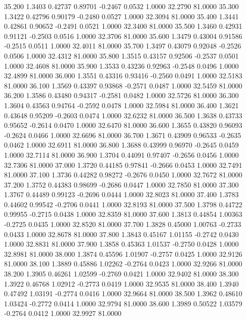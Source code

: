   35.200   1.3403   0.42737   0.89701  -0.2467   0.0532   1.0000  32.2790  81.0000
  35.300   1.3422   0.42796   0.90179  -0.2480   0.0527   1.0000  32.3094  81.0000
  35.400   1.3441   0.42861   0.90652  -0.2491   0.0521   1.0000  32.3400  81.0000
  35.500   1.3460   0.42931   0.91121  -0.2503   0.0516   1.0000  32.3706  81.0000
  35.600   1.3479   0.43004   0.91586  -0.2515   0.0511   1.0000  32.4011  81.0000
  35.700   1.3497   0.43079   0.92048  -0.2526   0.0506   1.0000  32.4312  81.0000
  35.800   1.3515   0.43157   0.92506  -0.2537   0.0501   1.0000  32.4608  81.0000
  35.900   1.3533   0.43236   0.92963  -0.2548   0.0496   1.0000  32.4899  81.0000
  36.000   1.3551   0.43316   0.93416  -0.2560   0.0491   1.0000  32.5183  81.0000
  36.100   1.3569   0.43397   0.93868  -0.2571   0.0487   1.0000  32.5459  81.0000
  36.200   1.3586   0.43480   0.94317  -0.2581   0.0482   1.0000  32.5726  81.0000
  36.300   1.3604   0.43563   0.94764  -0.2592   0.0478   1.0000  32.5984  81.0000
  36.400   1.3621   0.43648   0.95209  -0.2603   0.0474   1.0000  32.6232  81.0000
  36.500   1.3638   0.43733   0.95652  -0.2614   0.0470   1.0000  32.6470  81.0000
  36.600   1.3655   0.43820   0.96093  -0.2624   0.0466   1.0000  32.6696  81.0000
  36.700   1.3671   0.43909   0.96533  -0.2635   0.0462   1.0000  32.6911  81.0000
  36.800   1.3688   0.43999   0.96970  -0.2645   0.0459   1.0000  32.7114  81.0000
  36.900   1.3704   0.44091   0.97407  -0.2656   0.0456   1.0000  32.7306  81.0000
  37.000   1.3720   0.44185   0.97841  -0.2666   0.0453   1.0000  32.7491  81.0000
  37.100   1.3736   0.44282   0.98272  -0.2676   0.0450   1.0000  32.7672  81.0000
  37.200   1.3752   0.44383   0.98699  -0.2686   0.0447   1.0000  32.7850  81.0000
  37.300   1.3767   0.44489   0.99123  -0.2696   0.0444   1.0000  32.8023  81.0000
  37.400   1.3783   0.44602   0.99542  -0.2706   0.0441   1.0000  32.8193  81.0000
  37.500   1.3798   0.44722   0.99955  -0.2715   0.0438   1.0000  32.8359  81.0000
  37.600   1.3813   0.44854   1.00363  -0.2725   0.0435   1.0000  32.8520  81.0000
  37.700   1.3828   0.45000   1.00763  -0.2733   0.0433   1.0000  32.8678  81.0000
  37.800   1.3843   0.45167   1.01155  -0.2742   0.0430   1.0000  32.8831  81.0000
  37.900   1.3858   0.45363   1.01537  -0.2750   0.0428   1.0000  32.8981  81.0000
  38.000   1.3874   0.45596   1.01907  -0.2757   0.0425   1.0000  32.9126  81.0000
  38.100   1.3889   0.45886   1.02262  -0.2764   0.0423   1.0000  32.9266  81.0000
  38.200   1.3905   0.46261   1.02599  -0.2769   0.0421   1.0000  32.9402  81.0000
  38.300   1.3922   0.46768   1.02912  -0.2773   0.0419   1.0000  32.9535  81.0000
  38.400   1.3940   0.47492   1.03191  -0.2774   0.0416   1.0000  32.9664  81.0000
  38.500   1.3962   0.48610   1.03424  -0.2772   0.0414   1.0000  32.9794  81.0000
  38.600   1.3989   0.50522   1.03579  -0.2764   0.0412   1.0000  32.9927  81.0000

